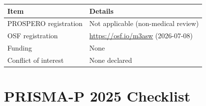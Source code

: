 \medskip
\begin{tabular}{p{3cm} p{9cm}}
\toprule
\textbf{Item} & \textbf{Details} \\
\midrule
PROSPERO registration & Not applicable (non-medical review) \\
OSF registration & \url{https://osf.io/m3asw} (2026-07-08) \\
Funding & None \\
Conflict of interest & None declared \\
\bottomrule
\end{tabular}

\section*{PRISMA-P 2025 Checklist}

